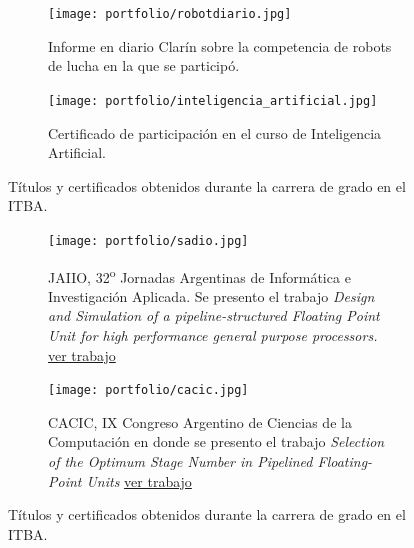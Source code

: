    \begin{figure}
      \begin{center}
      \ContinuedFloat
         \begin{subfigure}[b]{0.40\textwidth}
            \begin{center}
               \texttt{[image: portfolio/robotdiario.jpg]}
               \caption{Informe en diario Clarín sobre la competencia de robots de lucha en la que se participó.}
               \label{fig:robotdiario}
            \end{center}
         \end{subfigure}%
         \hfill
         \begin{subfigure}[b]{0.55\textwidth}
            \texttt{[image: portfolio/inteligencia\_artificial.jpg]}
            \caption{Certificado de participación en el curso de Inteligencia Artificial.}
            \label{fig:foto_ai}
         \end{subfigure}%
      \caption{Títulos y certificados obtenidos durante la carrera de grado en el ITBA.}
      \label{fig:titulos_del_itba}
      \end{center}
   \end{figure}

   \begin{figure}
      \begin{center}
      \ContinuedFloat
         \begin{subfigure}[b]{0.45\textwidth}
            \texttt{[image: portfolio/sadio.jpg]}
            \caption{JAIIO, 32\textsuperscript{o} Jornadas Argentinas de Informática e Investigación Aplicada. Se presento el trabajo \emph{Design and Simulation of a pipeline-structured Floating Point Unit for high performance general purpose processors.} \href{https://drive.google.com/open?id=15NkqA_rWbaObx1uiqe7ruBg9lWpIh5q7}{ver trabajo}}
            \label{fig:jaiio}
         \end{subfigure}%
         \hfill
         \begin{subfigure}[b]{0.45\textwidth}
            \texttt{[image: portfolio/cacic.jpg]}
            \caption{CACIC, IX Congreso Argentino de Ciencias de la Computación en donde se presento el trabajo \emph{Selection of the Optimum Stage Number in Pipelined Floating-Point Units} \href{https://drive.google.com/open?id=11z5qRrJ01Is6dx5NMHAOoXl3D0r2o8OY}{ver trabajo}}
            \label{fig:cacic}
         \end{subfigure}%
      \end{center}
      \caption{Títulos y certificados obtenidos durante la carrera de grado en el ITBA.}
      \label{fig:titulos_del_itba}
   \end{figure}

